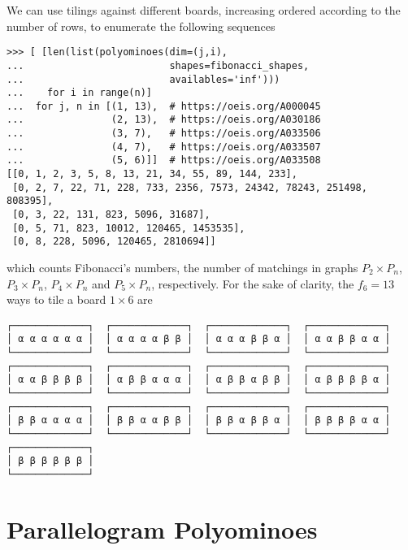 We can use tilings against different boards, increasing ordered according to the
number of rows, to enumerate the following sequences
\begin{verbatim}
>>> [ [len(list(polyominoes(dim=(j,i),
...                         shapes=fibonacci_shapes,
...                         availables='inf')))
...    for i in range(n)]
...  for j, n in [(1, 13),  # https://oeis.org/A000045
...               (2, 13),  # https://oeis.org/A030186
...               (3, 7),   # https://oeis.org/A033506
...               (4, 7),   # https://oeis.org/A033507
...               (5, 6)]]  # https://oeis.org/A033508
[[0, 1, 2, 3, 5, 8, 13, 21, 34, 55, 89, 144, 233],
 [0, 2, 7, 22, 71, 228, 733, 2356, 7573, 24342, 78243, 251498, 808395],
 [0, 3, 22, 131, 823, 5096, 31687],
 [0, 5, 71, 823, 10012, 120465, 1453535],
 [0, 8, 228, 5096, 120465, 2810694]]
\end{verbatim}
which counts Fibonacci's numbers, the number of matchings in graphs $P_2 \times
P_n$, $P_{3} \times P_{n}$, $P_{4} \times P_{n}$ and $P_{5} \times P_{n}$,
respectively. For the sake of clarity, the $f_{6} = 13$ ways to tile a board $1\times 6$ are
{
\small
\begin{verbatim}
┌─────────────┐  ┌─────────────┐  ┌─────────────┐  ┌─────────────┐
│ α α α α α α │  │ α α α α β β │  │ α α α β β α │  │ α α β β α α │
└─────────────┘  └─────────────┘  └─────────────┘  └─────────────┘
┌─────────────┐  ┌─────────────┐  ┌─────────────┐  ┌─────────────┐
│ α α β β β β │  │ α β β α α α │  │ α β β α β β │  │ α β β β β α │
└─────────────┘  └─────────────┘  └─────────────┘  └─────────────┘
┌─────────────┐  ┌─────────────┐  ┌─────────────┐  ┌─────────────┐
│ β β α α α α │  │ β β α α β β │  │ β β α β β α │  │ β β β β α α │
└─────────────┘  └─────────────┘  └─────────────┘  └─────────────┘
┌─────────────┐
│ β β β β β β │
└─────────────┘
\end{verbatim}
}

\section{Parallelogram Polyominoes}

